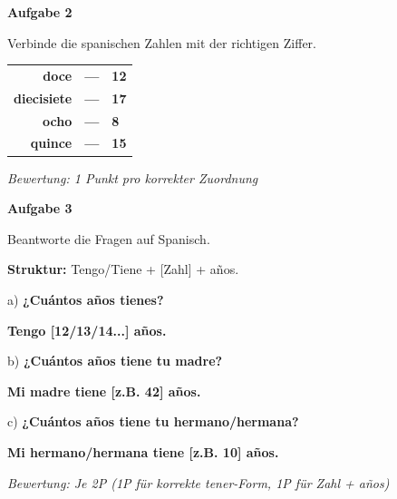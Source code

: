 \documentclass[11pt, a4paper]{article}
\newcommand{\fachfarbe}{spanisch}
\newcommand{\punktebox}[1]{\hfill\fbox{\small \_/#1}}
\newcommand{\loesung}[1]{\textcolor{loesung}{\textbf{#1}}}
\newcommand{\es}[1]{\textcolor{\fachfarbe}{\textbf{#1}}}
\newenvironment{aufgabe}[1]{%
    \needspace{5\baselineskip}%
    \nopagebreak[4]%
    \vspace{10pt}
    \noindent\textbf{\textcolor{\fachfarbe}{Aufgabe #1}}
    \nopagebreak[4]%
    \vspace{5pt}
    \nopagebreak[4]%
    \begin{list}{}{\leftmargin=0pt}
    \item[]
}{%
    \end{list}
}
\begin{document}
\begin{aufgabe}{2}
Verbinde die spanischen Zahlen mit der richtigen Ziffer. \punktebox{4}
\end{aufgabe}

\begin{center}
\begin{tabular}{rcl}
\es{doce} & \loesung{---} & \loesung{12} \\[0.8em]
\es{diecisiete} & \loesung{---} & \loesung{17} \\[0.8em]
\es{ocho} & \loesung{---} & \loesung{8} \\[0.8em]
\es{quince} & \loesung{---} & \loesung{15} \\
\end{tabular}
\end{center}

\textit{\textcolor{grau}{Bewertung: 1 Punkt pro korrekter Zuordnung}}

\vspace{15pt}


\begin{aufgabe}{3}
Beantworte die Fragen auf Spanisch. \punktebox{6}
\end{aufgabe}

\begin{hinweis}
\textbf{Struktur:} Tengo/Tiene + [Zahl] + años.
\end{hinweis}

\vspace{0.5em}

\noindent
a) \es{¿Cuántos años tienes?}

\loesung{Tengo [12/13/14...] años.}

\vspace{0.5em}

\noindent
b) \es{¿Cuántos años tiene tu madre?}

\loesung{Mi madre tiene [z.B. 42] años.}

\vspace{0.5em}

\noindent
c) \es{¿Cuántos años tiene tu hermano/hermana?}

\loesung{Mi hermano/hermana tiene [z.B. 10] años.}

\vspace{0.5em}

\textit{\textcolor{grau}{Bewertung: Je 2P (1P für korrekte tener-Form, 1P für Zahl + años)}}
\end{document}
